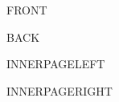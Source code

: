 \documentclass[a5paper,landscape]{scrartcl}
\begin{document}
\begin{multicols}{2}

FRONT

\columnbreak

BACK

\end{multicols}

\pagebreak

\begin{multicols}{2}

INNERPAGELEFT

\columnbreak

INNERPAGERIGHT

\end{multicols}
\end{document}
